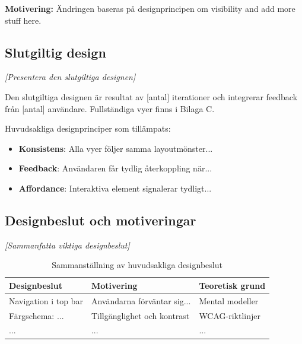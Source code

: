 \textbf{Motivering:} Ändringen baseras på designprincipen om visibility \cite{sharp2019} and add more stuff here.


\subsection{Slutgiltig design}

\textit{[Presentera den slutgiltiga designen]}

Den slutgiltiga designen är resultat av [antal] iterationer och integrerar feedback från [antal] användare. Fullständiga vyer finns i Bilaga C.

Huvudsakliga designprinciper som tillämpats:
\begin{itemize}
    \item \textbf{Konsistens}: Alla vyer följer samma layoutmönster...
    \item \textbf{Feedback}: Användaren får tydlig återkoppling när...
    \item \textbf{Affordance}: Interaktiva element signalerar tydligt...
\end{itemize}


\subsection{Designbeslut och motiveringar}

\textit{[Sammanfatta viktiga designbeslut]}

\begin{table}[h]
\centering
\begin{tabular}{|p{4cm}|p{5cm}|p{4cm}|}
\hline
\textbf{Designbeslut} & \textbf{Motivering} & \textbf{Teoretisk grund} \\
\hline
Navigation i top bar & Användarna förväntar sig... & Mental modeller \cite{sharp2019} \\
\hline
Färgschema: ... & Tillgänglighet och kontrast & WCAG-riktlinjer \\
\hline
... & ... & ... \\
\hline
\end{tabular}
\caption{Sammanställning av huvudsakliga designbeslut}
\end{table}
